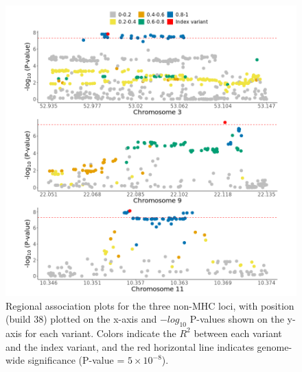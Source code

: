     \begin{figure}[H] 
      \centering    
      \includegraphics[width=1.0\textwidth]{Vector/ukbb_nonmhc_regional_assoc_plots.png}
      \caption[Regional association plots of pAD-associated non-MHC loci in the UKBB analysis]{Regional association plots for the three non-MHC loci, with position (build 38) plotted on the x-axis and $-log_{10}$ P-values shown on the y-axis for each variant. Colors indicate the $R^{2}$ between each variant and the index variant, and the red horizontal line indicates genome-wide significance (P-value = $5\times10^{-8}$).}
      \label{fig:ukbb_nonmhc_regional_assoc_plots}
      \end{figure}

